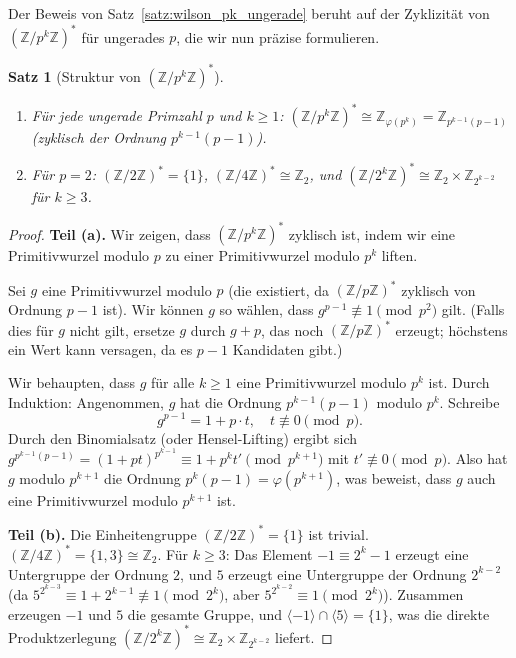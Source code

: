 \documentclass[12pt,a4paper]{amsart}
\newtheorem{theorem}{Satz}[section]
\theoremstyle{definition}
\newcommand{\Z}{\mathbb{Z}}
\begin{document}
Der Beweis von Satz~\ref{satz:wilson_pk_ungerade} beruht auf der Zyklizität
von $(\Z/p^k\Z)^*$ für ungerades $p$, die wir nun präzise formulieren.

\begin{theorem}[Struktur von $(\Z/p^k\Z)^*$]\label{satz:struktur}
  \begin{enumerate}
    \item[(a)] Für jede ungerade Primzahl $p$ und $k \geq 1$:
      $(\Z/p^k\Z)^* \cong \Z_{\varphi(p^k)} = \Z_{p^{k-1}(p-1)}$
      (zyklisch der Ordnung $p^{k-1}(p-1)$).
    \item[(b)] Für $p = 2$: $(\Z/2\Z)^* = \{1\}$, $(\Z/4\Z)^* \cong \Z_2$,
      und $(\Z/2^k\Z)^* \cong \Z_2 \times \Z_{2^{k-2}}$ für $k \geq 3$.
  \end{enumerate}
\end{theorem}

\begin{proof}
  \textbf{Teil (a).}
  Wir zeigen, dass $(\Z/p^k\Z)^*$ zyklisch ist, indem wir eine Primitivwurzel
  modulo $p$ zu einer Primitivwurzel modulo $p^k$ liften.

  Sei $g$ eine Primitivwurzel modulo $p$ (die existiert, da $(\Z/p\Z)^*$
  zyklisch von Ordnung $p-1$ ist). Wir können $g$ so wählen, dass
  $g^{p-1} \not\equiv 1 \pmod{p^2}$ gilt. (Falls dies für $g$ nicht gilt,
  ersetze $g$ durch $g + p$, das noch $(\Z/p\Z)^*$ erzeugt; höchstens ein
  Wert kann versagen, da es $p-1$ Kandidaten gibt.)

  Wir behaupten, dass $g$ für alle $k \geq 1$ eine Primitivwurzel modulo
  $p^k$ ist. Durch Induktion: Angenommen, $g$ hat die Ordnung
  $p^{k-1}(p-1)$ modulo $p^k$. Schreibe
  \[
    g^{p-1} = 1 + p \cdot t, \quad t \not\equiv 0 \pmod{p}.
  \]
  Durch den Binomialsatz (oder Hensel-Lifting) ergibt sich
  $g^{p^{k-1}(p-1)} = (1+pt)^{p^{k-1}} \equiv 1 + p^k t' \pmod{p^{k+1}}$
  mit $t' \not\equiv 0 \pmod{p}$.
  Also hat $g$ modulo $p^{k+1}$ die Ordnung $p^k(p-1) = \varphi(p^{k+1})$,
  was beweist, dass $g$ auch eine Primitivwurzel modulo $p^{k+1}$ ist.

  \textbf{Teil (b).}
  Die Einheitengruppe $(\Z/2\Z)^* = \{1\}$ ist trivial.
  $(\Z/4\Z)^* = \{1, 3\} \cong \Z_2$.
  Für $k \geq 3$: Das Element $-1 \equiv 2^k - 1$ erzeugt eine Untergruppe
  der Ordnung $2$, und $5$ erzeugt eine Untergruppe der Ordnung $2^{k-2}$
  (da $5^{2^{k-3}} \equiv 1 + 2^{k-1} \not\equiv 1 \pmod{2^k}$, aber
  $5^{2^{k-2}} \equiv 1 \pmod{2^k}$). Zusammen erzeugen $-1$ und $5$ die
  gesamte Gruppe, und $\langle -1 \rangle \cap \langle 5 \rangle = \{1\}$,
  was die direkte Produktzerlegung $(\Z/2^k\Z)^* \cong \Z_2 \times \Z_{2^{k-2}}$
  liefert.
\end{proof}
\end{document}

